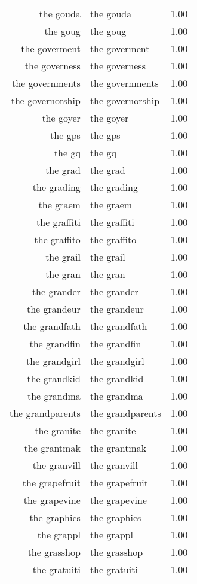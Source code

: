 \begin{table}[ht]
\begin{tabular}{rlr}
  the gouda & the gouda & 1.00 \\ 
  the goug & the goug & 1.00 \\ 
  the goverment & the goverment & 1.00 \\ 
  the governess & the governess & 1.00 \\ 
  the governments & the governments & 1.00 \\ 
  the governorship & the governorship & 1.00 \\ 
  the goyer & the goyer & 1.00 \\ 
  the gps & the gps & 1.00 \\ 
  the gq & the gq & 1.00 \\ 
  the grad & the grad & 1.00 \\ 
  the grading & the grading & 1.00 \\ 
  the graem & the graem & 1.00 \\ 
  the graffiti & the graffiti & 1.00 \\ 
  the graffito & the graffito & 1.00 \\ 
  the grail & the grail & 1.00 \\ 
  the gran & the gran & 1.00 \\ 
  the grander & the grander & 1.00 \\ 
  the grandeur & the grandeur & 1.00 \\ 
  the grandfath & the grandfath & 1.00 \\ 
  the grandfin & the grandfin & 1.00 \\ 
  the grandgirl & the grandgirl & 1.00 \\ 
  the grandkid & the grandkid & 1.00 \\ 
  the grandma & the grandma & 1.00 \\ 
  the grandparents & the grandparents & 1.00 \\ 
  the granite & the granite & 1.00 \\ 
  the grantmak & the grantmak & 1.00 \\ 
  the granvill & the granvill & 1.00 \\ 
  the grapefruit & the grapefruit & 1.00 \\ 
  the grapevine & the grapevine & 1.00 \\ 
  the graphics & the graphics & 1.00 \\ 
  the grappl & the grappl & 1.00 \\ 
  the grasshop & the grasshop & 1.00 \\ 
  the gratuiti & the gratuiti & 1.00 \\ 

\end{tabular}
\end{table}
